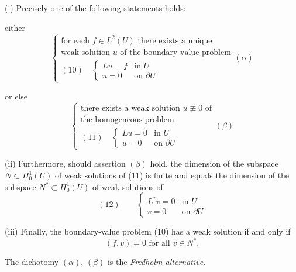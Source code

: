\begin{theorem}
\label{thm:second-existence-fredholm-alternative}
(i) Precisely one of the following statements holds:

either
$$\begin{cases} \text{for each } f \in L^2(U) \text{ there exists a unique} \\ \text{weak solution } u \text{ of the boundary-value problem} \\ (10) \quad \begin{cases} Lu = f & \text{in } U \\ u = 0 & \text{on } \partial U \end{cases} \end{cases} (\alpha)$$

or else
$$\begin{cases} \text{there exists a weak solution } u \not\equiv 0 \text{ of} \\ \text{the homogeneous problem} \\ (11) \quad \begin{cases} Lu = 0 & \text{in } U \\ u = 0 & \text{on } \partial U \end{cases} \end{cases} (\beta)$$

(ii) Furthermore, should assertion $(\beta)$ hold, the dimension of the subspace $N \subset H_0^1(U)$ of weak solutions of (11) is finite and equals the dimension of the subspace $N^* \subset H_0^1(U)$ of weak solutions of
$$(12) \qquad \begin{cases} L^*v = 0 & \text{in } U \\ v = 0 & \text{on } \partial U \end{cases}$$

(iii) Finally, the boundary-value problem (10) has a weak solution if and only if
$$(f,v) = 0 \text{ for all } v \in N^*.$$

The dichotomy $(\alpha)$, $(\beta)$ is the \textit{Fredholm alternative}.
\end{theorem}

